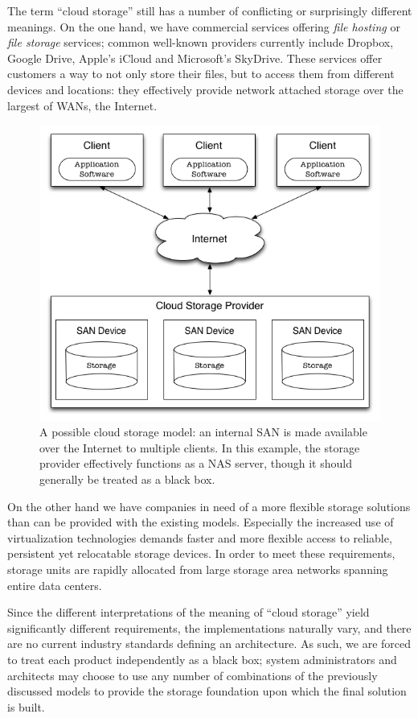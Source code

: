 The term ``cloud storage'' still has a number of
conflicting or surprisingly different meanings.  On
the one hand, we have commercial services offering
{\em file hosting} or {\em file storage} services;
common well-known providers currently include Dropbox,
Google Drive, Apple's iCloud and Microsoft's SkyDrive.
These services offer customers a way to not only store
their files, but to access them from different devices
and locations: they effectively provide network
attached storage over the largest of WANs, the
Internet.

\begin{figure}[ht]
	\centering
	\includegraphics[width=.66\textwidth]{04/pics/cloud-storage}
		\caption[Cloud Storage]{A possible cloud storage model: an
			internal SAN is made available over the Internet to
			multiple clients.  In this example, the storage
			provider effectively functions as a NAS server,
			though it should generally be treated as a black box.
			\label{fig:storage:cloud}}
\end{figure}

On the other hand we have companies in need of a more
flexible storage solutions than can be provided with
the existing models.  Especially the increased use of
virtualization technologies demands faster and more
flexible access to reliable, persistent yet
relocatable storage devices.  In order to meet these
requirements, storage units are rapidly allocated from
large storage area networks spanning entire data
centers.

Since the different interpretations of the meaning of
``cloud storage'' yield significantly different
requirements, the implementations naturally vary, and
there are no current industry standards defining an
architecture.  As such, we are forced to treat each
product independently as a black box; system
administrators and architects may choose to use any
number of combinations of the previously discussed
models to provide the storage foundation upon which
the final solution is built.

